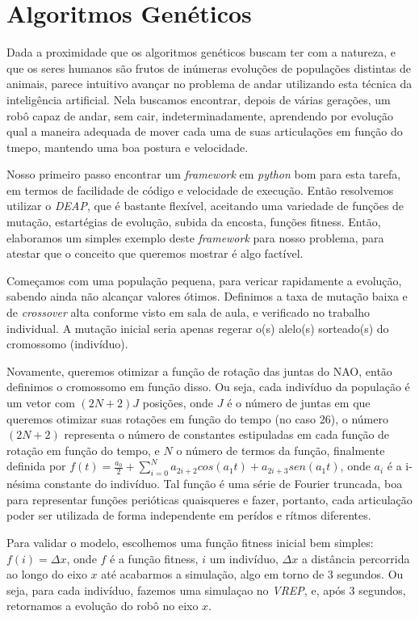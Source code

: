\documentclass[twoside,conference,a4paper]{IEEEtran}
\begin{document}
\section{Algoritmos Genéticos} \label{algoritmos_geneticos}

Dada a proximidade que os algoritmos genéticos buscam ter com a natureza, e que os seres humanos são frutos de inúmeras evoluções de populações distintas de animais, parece intuitivo avançar no problema de andar utilizando esta técnica da inteligência artificial. Nela buscamos encontrar, depois de várias gerações, um robô capaz de andar, sem cair, indeterminadamente, aprendendo por evolução qual a maneira adequada de mover cada uma de suas articulações em função do tmepo, mantendo uma boa postura e velocidade.

Nosso primeiro passo encontrar um \textsl{framework} em \textsl{python} bom para esta tarefa, em termos de facilidade de código e velocidade de execução. Então resolvemos utilizar o \textsl{DEAP}\cite{deap}, que é bastante flexível, aceitando uma variedade de funções de mutação, estartégias de evolução, subida da encosta, funções fitness. Então, elaboramos um simples exemplo deste \textsl{framework} para nosso problema, para atestar que o conceito que queremos mostrar é algo factível.

Começamos com uma população pequena, para vericar rapidamente a evolução, sabendo ainda não alcançar valores ótimos. Definimos a taxa de mutação baixa e de \textsl{crossover} alta conforme visto em sala de aula, e verificado no trabalho individual. A mutação inicial seria apenas regerar o(s) alelo(s) sorteado(s) do cromossomo (indivíduo).

Novamente, queremos otimizar a função de rotação das juntas do NAO, então definimos o cromossomo em função disso. Ou seja, cada indivíduo da população é um vetor com $(2N+2)J$ posições, onde $J$ é o número de juntas em que queremos otimizar suas rotações em função do tempo (no caso 26), o número $(2N+2)$ representa o número de constantes estipuladas em cada função de rotação em função do tempo, e $N$ o número de termos da função, finalmente definida por $f(t) = \frac{a_0}{2}+\sum_{i=0}^N a_{2i+2} cos(a_{1} t) + a_{2i+3} sen(a_{1} t)$, onde $a_i$ é a i-nésima constante do indivíduo. Tal função é uma série de Fourier truncada, boa para representar funções perióticas quaisqueres e fazer, portanto, cada articulação poder ser utilizada de forma independente em perídos e rítmos diferentes.

Para validar o modelo, escolhemos uma função fitness inicial bem simples: $f(i)=\Delta x$, onde $f$ é a função fitness, $i$ um indivíduo, $\Delta x$ a distância percorrida ao longo do eixo $x$ até acabarmos a simulação, algo em torno de 3 segundos. Ou seja, para cada indivíduo, fazemos uma simulaçao no \textsl{VREP}, e, após 3 segundos, retornamos a evolução do robô no eixo $x$.
\end{document}
